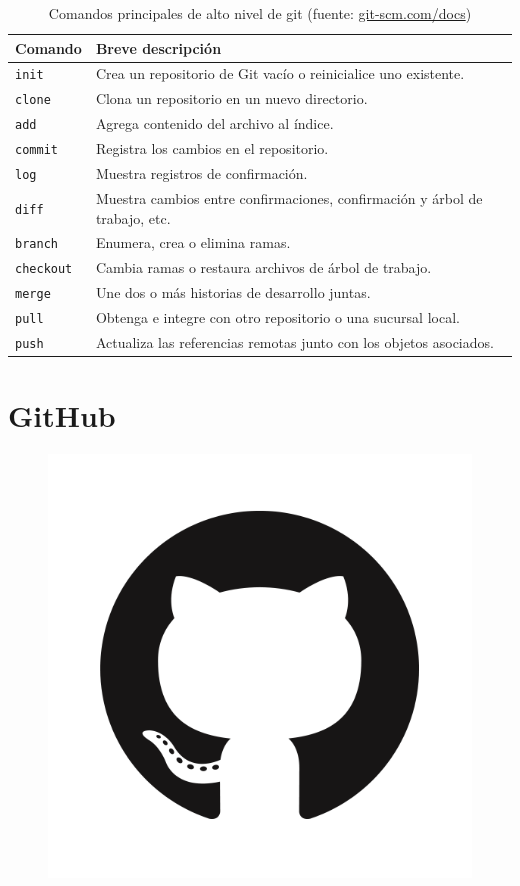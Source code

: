 \begin{table}[ht!]
	\caption{Comandos principales de alto nivel de git (fuente: \url{git-scm.com/docs})}
	\centering
	\begin{tabular}{@{} ll @{}}
	\toprule
	Comando & Breve descripción
	\tabularnewline
	\midrule
	\texttt{init} & Crea un repositorio de Git vacío o reinicialice uno existente.
	\tabularnewline
	\texttt{clone} & Clona un repositorio en un nuevo directorio.
	\tabularnewline
	\texttt{add} & Agrega contenido del archivo al índice.
	\tabularnewline
	\texttt{commit} & Registra los cambios en el repositorio.
	\tabularnewline
	\texttt{log} & Muestra registros de confirmación.
	\tabularnewline
	\texttt{diff} & Muestra cambios entre confirmaciones, confirmación y árbol de trabajo, etc.
	\tabularnewline
	\texttt{branch} & Enumera, crea o elimina ramas.
	\tabularnewline
	\texttt{checkout} & Cambia ramas o restaura archivos de árbol de trabajo.
	\tabularnewline
	\texttt{merge} & Une dos o más historias de desarrollo juntas.
	\tabularnewline
	\texttt{pull} & Obtenga e integre con otro repositorio o una sucursal local.
	\tabularnewline
	\texttt{push} & Actualiza las referencias remotas junto con los objetos asociados.
	\tabularnewline
	\bottomrule
	\end{tabular}
\end{table}

\section{GitHub}
\lipsum[1]
\begin{figure}
	\includegraphics[width=0.14\paperwidth]{./img/github}
\end{figure}
\lipsum[1]

